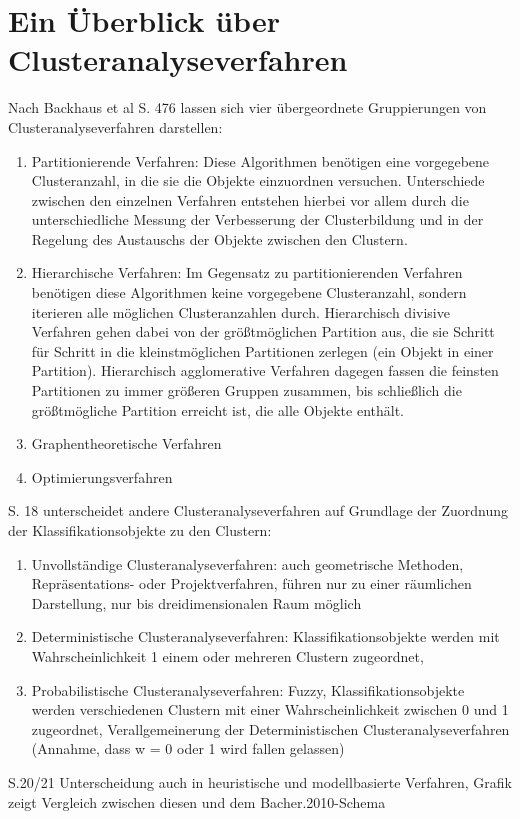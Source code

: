 \chapter{Ein Überblick über Clusteranalyseverfahren}

Nach Backhaus et al \cite{Backhaus.2016} S. 476 lassen sich vier übergeordnete Gruppierungen von Clusteranalyseverfahren darstellen:

\begin{enumerate}
	\item Partitionierende Verfahren: Diese Algorithmen benötigen eine vorgegebene Clusteranzahl, in die sie die Objekte einzuordnen versuchen. Unterschiede zwischen den einzelnen Verfahren entstehen hierbei vor allem durch die unterschiedliche Messung der Verbesserung der Clusterbildung und in der Regelung des Austauschs der Objekte zwischen den Clustern.
	\item Hierarchische Verfahren: Im Gegensatz zu partitionierenden Verfahren benötigen diese Algorithmen keine vorgegebene Clusteranzahl, sondern iterieren alle möglichen Clusteranzahlen durch. Hierarchisch divisive Verfahren gehen dabei von der größtmöglichen Partition aus, die sie Schritt für Schritt in die kleinstmöglichen Partitionen zerlegen (ein Objekt in einer Partition). Hierarchisch agglomerative Verfahren dagegen fassen die feinsten Partitionen zu immer größeren Gruppen zusammen, bis schließlich die größtmögliche Partition erreicht ist, die alle Objekte enthält.
	\item Graphentheoretische Verfahren
	\item Optimierungsverfahren
\end{enumerate}

\cite{Bacher.2010} S. 18 unterscheidet andere Clusteranalyseverfahren auf Grundlage der Zuordnung der Klassifikationsobjekte zu den Clustern:

\begin{enumerate}
	\item Unvollständige Clusteranalyseverfahren: auch geometrische Methoden, Repräsentations- oder Projektverfahren, führen nur zu einer räumlichen Darstellung, nur bis dreidimensionalen Raum möglich
	\item Deterministische Clusteranalyseverfahren: Klassifikationsobjekte werden mit Wahrscheinlichkeit 1 einem oder mehreren Clustern zugeordnet, 
	\item Probabilistische Clusteranalyseverfahren: Fuzzy, Klassifikationsobjekte werden verschiedenen Clustern mit einer Wahrscheinlichkeit zwischen 0 und 1 zugeordnet, Verallgemeinerung der Deterministischen Clusteranalyseverfahren (Annahme, dass w = 0 oder 1 wird fallen gelassen)
\end{enumerate}
S.20/21 \cite{Bacher.2010} Unterscheidung auch in heuristische und modellbasierte Verfahren, Grafik zeigt Vergleich zwischen diesen und dem Bacher.2010-Schema

